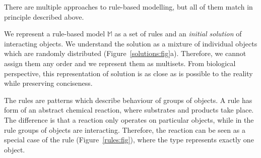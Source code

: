 \documentclass[12pt, twoside]{fithesis2} %
\begin{document}
There are multiple approaches to rule-based modelling, but all of them match in principle described above.

We represent a rule-based model $\mathds{M}$ as a set of rules and an \emph{initial solution} of interacting objects. We understand the solution as a mixture of individual objects which are randomly distributed (Figure~\ref{solutions:fig}a). Therefore, we cannot assign them any order and we represent them as multisets. From biological perspective, this representation of solution is as close as is possible to the reality while preserving conciseness.

The rules are patterns which describe behaviour of groups of objects. A rule has form of an abstract chemical reaction, where substrates and products take place. The difference is that a reaction only operates on particular objects, while in the rule groups of objects are interacting. Therefore, the reaction can be seen as a special case of the rule (Figure~\ref{rules:fig}), where the type represents exactly one object.
\end{document}
